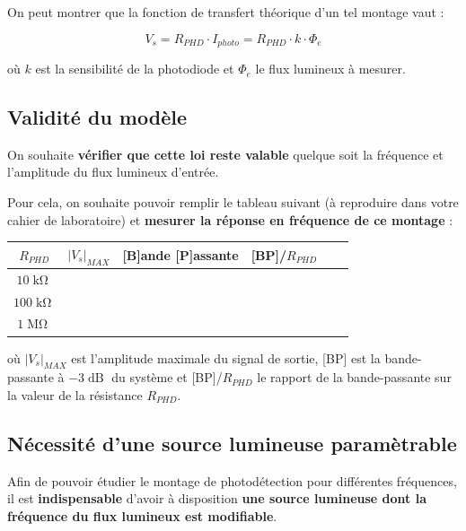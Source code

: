 \medskip

On peut montrer que la fonction de transfert théorique d'un tel montage vaut :

\[
\boxed{V_s = R_{PHD} \cdot I_{photo} = R_{PHD} \cdot k \cdot \Phi_{e}}
\]

où $k$ est la sensibilité de la photodiode et $\Phi_e$ le flux lumineux à mesurer.

\subsection{Validité du modèle}

On souhaite \textbf{vérifier que cette loi reste valable} quelque soit la fréquence et l'amplitude du flux lumineux d'entrée.

\medskip

Pour cela, on souhaite pouvoir remplir le tableau suivant (à reproduire dans votre cahier de laboratoire) et \textbf{mesurer la réponse en fréquence de ce montage} :

\medskip

\begin{center}
\begin{tabular}{|c|c|c|c|c|c|}
  \hline
  $R_{PHD}$ & $|V_s|_{MAX}$ & [B]ande [P]assante & [BP]/$R_{PHD}$ \\
  \hline
  $10\operatorname{k\Omega}$ & & & \\
  \hline
  $100\operatorname{k\Omega}$ & & & \\
  \hline
  $1\operatorname{M\Omega}$ & & & \\
  \hline
\end{tabular}
\end{center}

où $|V_s|_{MAX}$ est l'amplitude maximale du signal de sortie, [BP] est la bande-passante à $-3\operatorname{dB}$ du système et [BP]/$R_{PHD}$ le rapport de la bande-passante sur la valeur de la résistance $R_{PHD}$.

\bigskip

\subsection{Nécessité d'une source lumineuse paramètrable}

Afin de pouvoir étudier le montage de photodétection pour différentes fréquences, il est \textbf{indispensable} d'avoir à disposition \textbf{une source lumineuse dont la fréquence du flux lumineux est modifiable}.


